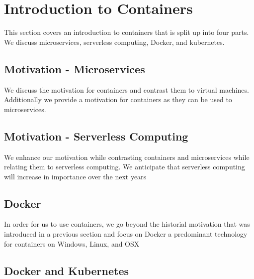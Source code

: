 
\chapter{Introduction to Containers}
\label{c:container}

\FILENAME

This section covers an introduction to containers that is split up
into four parts. We discuss microservices, serverless computing,
Docker, and kubernetes.

\section{Motivation - Microservices}
\label{s:motivation-microservices}

We discuss the motivation for containers and contrast them to virtual
machines. Additionally we provide a motivation for containers as they
can be used to microservices.


\section{Motivation - Serverless Computing}
\label{s:motivation-serverless}

We enhance our motivation while contrasting containers and
microservices while relating them to serverless computing. We
anticipate that serverless computing will increase in importance over
the next years


\section{Docker}
\label{s:motivation-docker}

In order for us to use containers, we go beyond the historial
motivation that was introduced in a previous section and focus on
Docker a predominant technology for containers on Windows, Linux, and
OSX


\section{Docker and Kubernetes}
\label{s:motivation-docker-kubernetes}

